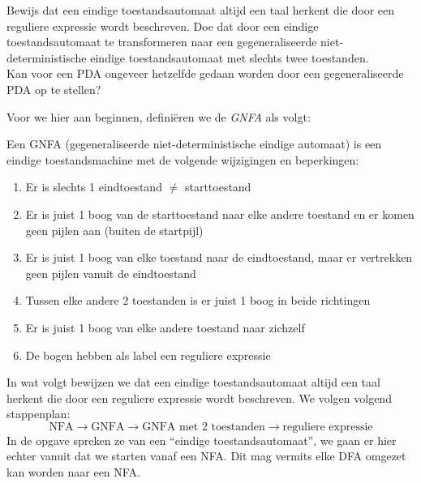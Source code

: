 \begin{quest}[Vraag 3]
Bewijs dat een eindige toestandsautomaat altijd een taal herkent die door een reguliere expressie wordt beschreven. Doe dat door een eindige toestandsautomaat te transformeren naar een gegeneraliseerde niet-deterministische eindige toestandsautomaat met slechts twee toestanden.\\
Kan voor een PDA ongeveer hetzelfde gedaan worden door een gegeneraliseerde PDA op te stellen?\\
\end{quest}

Voor we hier aan beginnen, defini\"eren we de \emph{GNFA} als volgt:
\begin{theorem}[GNFA]
Een GNFA (gegeneraliseerde niet-deterministische eindige automaat) is een eindige toestandsmachine met de volgende wijzigingen en beperkingen:
\begin{enumerate}
\item Er is slechts 1 eindtoestand $\neq$ starttoestand
\item Er is juist 1 boog van de starttoestand naar elke andere toestand en er komen geen pijlen aan (buiten de startpijl)
\item Er is juist 1 boog van elke toestand naar de eindtoestand, maar er vertrekken geen pijlen vanuit de eindtoestand
\item Tussen elke andere 2 toestanden is er juist 1 boog in beide richtingen
\item Er is juist 1 boog van elke andere toestand naar zichzelf
\item De bogen hebben als label een reguliere expressie
\end{enumerate}
\end{theorem}
In wat volgt bewijzen we dat een eindige toestandsautomaat altijd een taal herkent die door een reguliere expressie wordt beschreven. We volgen volgend stappenplan:
$$ \text{NFA} \rightarrow \text{GNFA} \rightarrow \text{GNFA met 2 toestanden} \rightarrow \text{reguliere expressie} $$
In de opgave spreken ze van een ``eindige toestandsautomaat'', we gaan er hier echter vanuit dat we starten vanaf een NFA. Dit mag vermits elke DFA omgezet kan worden naar een NFA.

